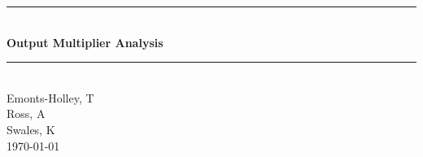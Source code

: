 \documentclass[11pt,a4paper]{report}
\numberwithin{figure}{section}
\numberwithin{table}{section}
\numberwithin{equation}{section}
\begin{document}

\begin{titlepage}
\thispagestyle{empty}
\newcommand{\HRule}{\rule{\linewidth}{0.00mm}} 
\center 
\HRule \\[0.4cm]
{ \huge \bfseries Output Multiplier Analysis}\\[0.4cm] 
\HRule \\[3.5cm]
{\small Emonts-Holley, T\\Ross, A\\Swales, K} \\ [4cm] 
{\small \today}\\[3cm] %
\vfill 
\end{titlepage}




\end{document}
